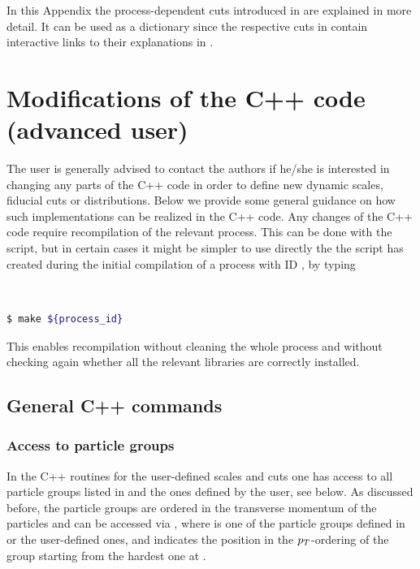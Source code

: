 \documentclass[english,11pt]{article}
\begin{document}
In this Appendix the process-dependent cuts introduced in 
are explained in more detail. It can be used as a dictionary since 
the respective cuts in  contain interactive links  
to their explanations in .



\gdef\thesection{Appendix \Alph{section}}
\section{Modifications of the C++ code (advanced user)}\label{app:advancedstuff}
\gdef\thesection{\Alph{section}}


The user is generally advised to contact the authors if he/she is interested in changing any parts of the C++ code in order 
to define new dynamic scales, fiducial cuts or distributions. Below we provide some general guidance on how 
such implementations can be realized in the C++ code. Any changes of the C++ code require recompilation of the relevant 
process. This can be done with the  script, but in certain cases it might be simpler to use directly 
the  the  script has created during the initial compilation of a process with ID , by typing
\lstset{basicstyle=\small, frame=none}
{\tt
\begin{lstlisting}[language=bash]
 $ make ${process_id}
\end{lstlisting}
}
This enables recompilation without cleaning the whole process and without checking again whether all the relevant libraries are 
correctly installed.

\subsection{General C++ commands}
\subsubsection{Access to particle groups}

In the C++ routines for the user-defined scales and cuts one has access to all particle groups listed in  
and the ones defined by the user, see below. As discussed before, the particle groups are ordered in 
the transverse momentum of the particles and can be accessed via , %
where  %
is one of the particle groups defined in  or the user-defined 
ones, and  indicates the position in the $p_T{}$-ordering of the group starting from the hardest 
one at .
\end{document}
